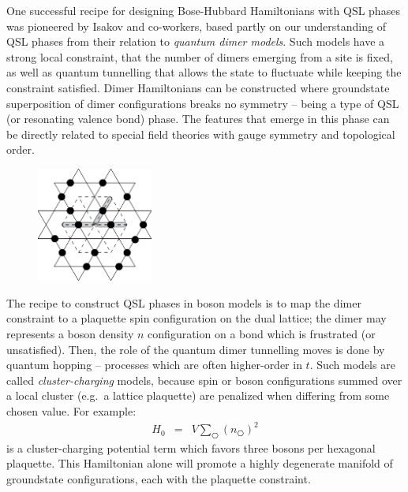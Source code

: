 \documentclass[aps,prb,groupedaddress,twocolumn]{revtex4}
\begin{document}
One successful recipe for designing Bose-Hubbard Hamiltonians with QSL phases was pioneered by Isakov and co-workers,\cite{Isakov1, Isakov2, TopoEE} based partly on our understanding of QSL phases from their relation to {\it quantum dimer models}.  Such models have a strong local constraint, that the number of dimers emerging from a site is fixed, as well as quantum tunnelling that allows the state to fluctuate while keeping the constraint satisfied.  Dimer Hamiltonians can be constructed where groundstate superposition of dimer configurations breaks no symmetry -- being a type of QSL (or resonating valence bond) phase.  The features that emerge in this phase can be directly related to special field theories with gauge symmetry and topological order.


\begin{figure}
\includegraphics[width=1.5in]{kagome.pdf}
  \caption{ }
\end{figure}

The recipe to construct QSL phases in boson models is to map the dimer constraint to a plaquette spin configuration on the dual lattice; the dimer may represents a boson density $n$ configuration on a bond which is frustrated (or unsatisfied).  Then, the role of the quantum dimer tunnelling moves is done by quantum hopping -- processes which are often higher-order in $t$.  Such models are called
{\it cluster-charging} models,\cite{Isakov2} because spin or boson configurations summed over a local cluster (e.g.~a lattice plaquette) are penalized when differing from some chosen value.  For example:
\begin{eqnarray}
H_0 &=& V \sum_{\hexagon} (n_{\hexagon})^2 
\end{eqnarray}
is a  cluster-charging potential term which favors three bosons per hexagonal plaquette.  This Hamiltonian alone will promote a highly degenerate manifold of groundstate configurations, each with the plaquette constraint.  
\end{document}
